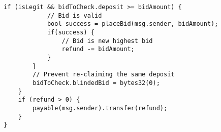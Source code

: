 \begin{lstlisting}[language=Solidity]
		if (isLegit && bidToCheck.deposit >= bidAmount) {
			// Bid is valid
			bool success = placeBid(msg.sender, bidAmount);
			if(success) {
				// Bid is new highest bid
				refund -= bidAmount;
			}
		}
		// Prevent re-claiming the same deposit
		bidToCheck.blindedBid = bytes32(0);
	}
	if (refund > 0) {
		payable(msg.sender).transfer(refund);
	}
}
\end{lstlisting}